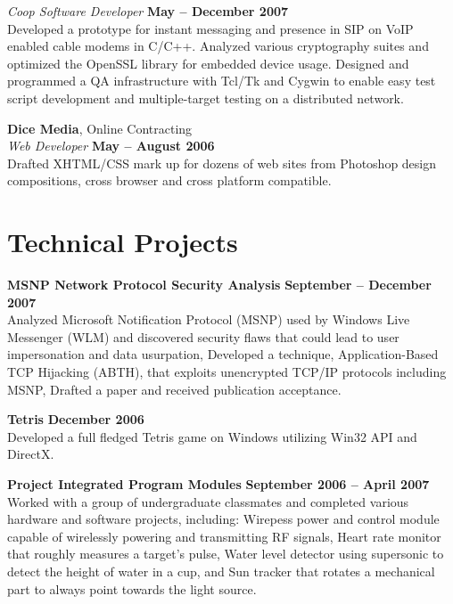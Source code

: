 \documentclass[margin,line]{resume}
\begin{document}
\begin{resume}
    \textsl{Coop Software Developer} \hfill \textbf{May -- December 2007}\\
    Developed a prototype for instant messaging and presence in SIP on VoIP enabled cable modems in C/C++.
    Analyzed various cryptography suites and optimized the OpenSSL library for embedded device usage.
    Designed and programmed a QA infrastructure with Tcl/Tk and Cygwin to enable easy test script development and multiple-target testing on a distributed network.

    \textbf{Dice Media}, Online Contracting \vspace{2mm}\\\vspace{1mm}%
    \textsl{Web Developer} \hfill \textbf{May -- August 2006}\\
    Drafted XHTML/CSS mark up for dozens of web sites from Photoshop design compositions, cross browser and cross platform compatible.

    \section{\mysidestyle Technical Projects}
    \textbf{MSNP Network Protocol Security Analysis} \hfill \textbf{September -- December 2007} \vspace{2mm}\\\vspace{1mm}%
    Analyzed Microsoft Notification Protocol (MSNP) used by Windows Live Messenger (WLM) and discovered security flaws that could lead to user impersonation and data usurpation,
    Developed a technique, Application-Based TCP Hijacking (ABTH), that exploits unencrypted TCP/IP protocols including MSNP,
    Drafted a paper and received publication acceptance.

    \textbf{Tetris} \hfill \textbf{December 2006} \vspace{2mm}\\\vspace{1mm}%
    Developed a full fledged Tetris game on Windows utilizing Win32 API and DirectX.

    \textbf{Project Integrated Program Modules} \hfill \textbf{September 2006 -- April 2007} \vspace{2mm}\\\vspace{1mm}%
    Worked with a group of undergraduate classmates and completed various hardware and software projects, including:
    Wirepess power and control module capable of wirelessly powering and transmitting RF signals,
    Heart rate monitor that roughly measures a target's pulse,
    Water level detector using supersonic to detect the height of water in a cup, and
    Sun tracker that rotates a mechanical part to always point towards the light source.


\end{resume}
\end{document}
